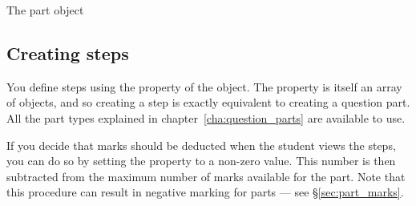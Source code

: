 \begin{chapter}{\label{cha:part_object}The part object}
  \subsection{Creating steps}
  You define steps using the  property of the 
  object.  The  property is itself an array of
   objects, and so creating a step is exactly equivalent to
  creating a question part.  All the part types explained in
  chapter~\ref{cha:question_parts} are available to use.

  If you decide that marks should be deducted when the student views the
  steps, you can do so by setting the  property to a
  non-zero value.  This number is then subtracted from the maximum number of
  marks available for the part.  Note that this procedure can result in
  negative marking for parts --- see \S\ref{sec:part_marks}.
  
\end{chapter}
